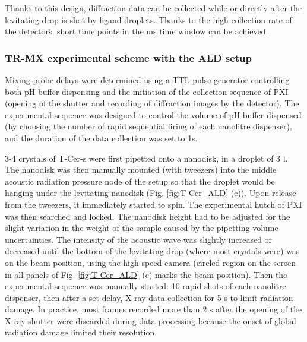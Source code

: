 Thanks to this design, diffraction data can be collected while or directly after the levitating drop is shot by ligand droplets. Thanks to the high collection rate of the detectors, short time points in the ms time window can be achieved. 



\subsubsection{TR-MX experimental scheme with the ALD setup}\label{sec:ALD_protocol}

Mixing-probe delays were determined using a TTL pulse generator controlling both pH buffer dispensing and the initiation of the collection sequence of PXI (opening of the shutter and recording of diffraction images by the detector). The experimental sequence was designed to control the volume of pH buffer dispensed (by choosing the number of rapid sequential firing of each nanolitre dispenser), and the duration of the data collection was set to 1s. 

3-4 crystals of T-Cer-s were first pipetted onto a nanodisk, in a droplet of 3 \textmu l. The nanodisk was then manually mounted (with tweezers) into the middle acoustic radiation pressure node of the setup so that the droplet would be hanging under the levitating nanodisk (Fig. \ref{fig:T-Cer_ALD} (c)). Upon release from the tweezers, it immediately started to spin. The experimental hutch of PXI was then searched and locked. The nanodisk height had to be adjusted for the slight variation in the weight of the sample caused by the pipetting volume uncertainties. The intensity of the acoustic wave was slightly increased or decreased until the bottom of the levitating drop (where most crystals were) was on the beam position, using the high-speed camera (circled region on the screen in all panels of Fig. \ref{fig:T-Cer_ALD} (c) marks the beam position). Then the experimental sequence was manually started: 10 rapid shots of each nanolitre dispenser, then after a set delay, X-ray data collection for 5 s to limit radiation damage. In practice, most frames recorded more than 2 s after the opening of the X-ray shutter were discarded during data processing because the onset of global radiation damage limited their resolution.

